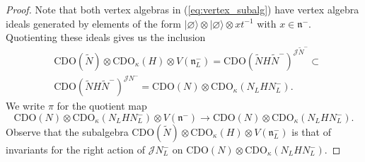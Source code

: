\documentclass{amsart}
\theoremstyle{definition}
\newcommand{\Jet}{\mathscr{J}}
\newcommand{\CDO}{\mathrm{CDO}}
\numberwithin{equation}{section}
\begin{document}
\begin{proof}
Note that both vertex algebras in (\ref{eq:vertex_subalg}) have vertex algebra ideals generated by elements of the form $|\varnothing\rangle\otimes |\varnothing\rangle\otimes xt^{-1}$ with $x\in \mathfrak{n}^-$. Quotienting these ideals gives us the inclusion
\begin{equation}\label{eq:vertex_subalg2}
\begin{split}
&\CDO(\widetilde{N})\otimes \CDO_\kappa(H)\otimes V(\mathfrak{n}^-_L)=\CDO(\widetilde{N}H\widetilde{N}^-)^{\Jet \widetilde{N}^-}\subset\\& 
\CDO(\widetilde{N}H\widetilde{N}^-)^{\Jet N^-}=\CDO(N)\otimes \CDO_\kappa(N_LHN_L^-).
\end{split}
\end{equation}
We write $\pi$ for the quotient map $$\CDO(N)\otimes \CDO_\kappa(N_LHN_L^-)\otimes V(\mathfrak{n}^-)\rightarrow \CDO(N)\otimes \CDO_\kappa(N_LHN_L^-).$$  
Observe that the subalgebra $\CDO(\widetilde{N})\otimes \CDO_\kappa(H)\otimes V(\mathfrak{n}^-_L)$ is that of invariants for the right action of $\Jet N^-_L$ on $\CDO(N)\otimes \CDO_\kappa(N_LHN_L^-)$. 


\end{proof}
\end{document}
